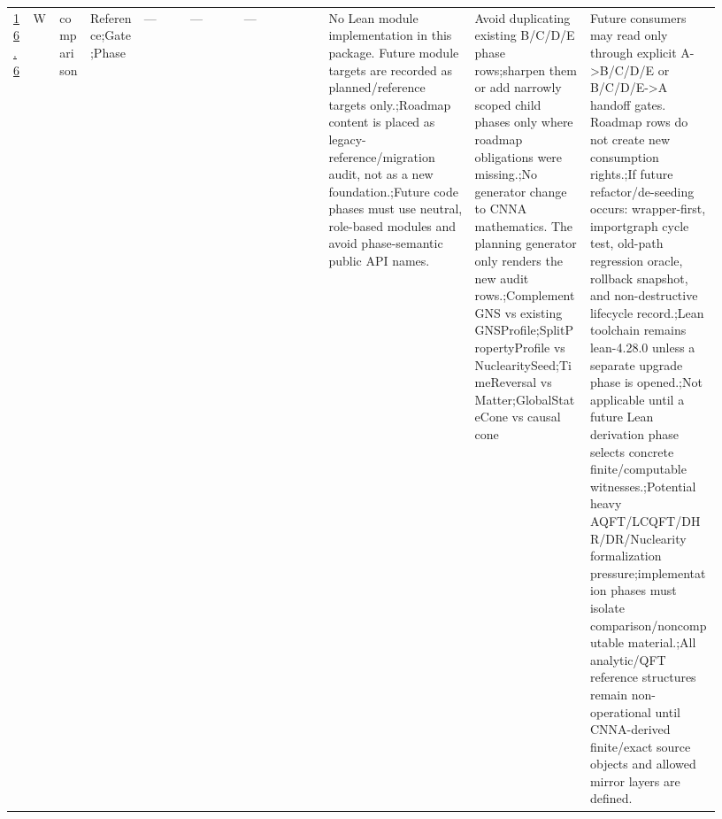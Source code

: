 \begin{longtable}{L{0.026\linewidth} L{0.024\linewidth} L{0.045\linewidth} L{0.07\linewidth} L{0.065\linewidth} L{0.075\linewidth} L{0.11\linewidth} L{0.19\linewidth} L{0.155\linewidth} L{0.17\linewidth}}
\hline
\addlinespace[0.24em]
\hyperlink{phase-row-16-6}{16.6} & W & comparison & Reference;\newline Gate;\newline Phase & --- & --- & --- & No Lean module implementation in this package. Future module targets are recorded as planned/\allowbreak{}reference targets only.;\newline Roadmap content is placed as legacy-reference/\allowbreak{}migration audit, not as a new foundation.;\newline Future code phases must use neutral, role-based modules and avoid phase-semantic public API names. & Avoid duplicating existing B/\allowbreak{}C/\allowbreak{}D/\allowbreak{}E phase rows;\newline sharpen them or add narrowly scoped child phases only where roadmap obligations were missing.;\newline No generator change to CNNA mathematics. The planning generator only renders the new audit rows.;\newline ComplementGNS vs existing GNSProfile;\newline SplitPropertyProfile vs NuclearitySeed;\newline TimeReversal vs Matter;\newline GlobalStateCone vs causal cone & Future consumers may read only through explicit A->B/\allowbreak{}C/\allowbreak{}D/\allowbreak{}E or B/\allowbreak{}C/\allowbreak{}D/\allowbreak{}E->A handoff gates. Roadmap rows do not create new consumption rights.;\newline If future refactor/\allowbreak{}de-seeding occurs: wrapper-first, importgraph cycle test, old-path regression oracle, rollback snapshot, and non-destructive lifecycle record.;\newline Lean toolchain remains lean-4.28.0 unless a separate upgrade phase is opened.;\newline Not applicable until a future Lean derivation phase selects concrete finite/\allowbreak{}computable witnesses.;\newline Potential heavy AQFT/\allowbreak{}LCQFT/\allowbreak{}DHR/\allowbreak{}DR/\allowbreak{}Nuclearity formalization pressure;\newline implementation phases must isolate comparison/\allowbreak{}noncomputable material.;\newline All analytic/\allowbreak{}QFT reference structures remain non-operational until CNNA-derived finite/\allowbreak{}exact source objects and allowed mirror layers are defined.\\

\end{longtable}
